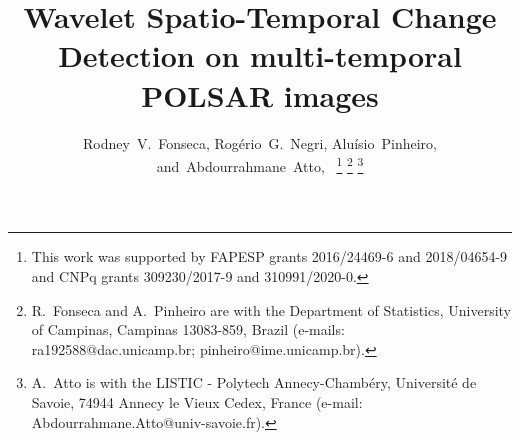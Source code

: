 \documentclass[journal]{IEEEtran}
\begin{document}
%
\title{Wavelet Spatio-Temporal Change Detection on multi-temporal POLSAR images}
%
%
%

\author{Rodney~V.~Fonseca, Rog\'{e}rio~G.~Negri,
        Alu\'{i}sio~Pinheiro,
        and~Abdourrahmane~Atto,~%
\thanks{This work was supported by FAPESP grants 2016/24469-6 and 2018/04654-9 and CNPq grants 309230/2017-9 and 310991/2020-0.}
\thanks{R.~Fonseca and A.~Pinheiro are with the Department of Statistics, University of Campinas, Campinas 13083-859, Brazil (e-mails: ra192588@dac.unicamp.br; pinheiro@ime.unicamp.br).}
\thanks{A.~Atto is with the LISTIC - Polytech Annecy-Chamb\'{e}ry, Universit\'{e} de Savoie, 74944 Annecy le Vieux Cedex, France (e-mail: Abdourrahmane.Atto@univ-savoie.fr).}}

% 
%
\end{document}
